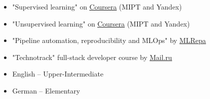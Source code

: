 \begin{itemize}
	\item "Supervised learning" on \href{https://www.coursera.org/learn/supervised-learning?specialization=machine-learning-data-analysis}{\underline{Coursera}} (MIPT and Yandex)
	\item "Unsupervised learning" on \href{https://www.coursera.org/learn/unsupervised-learning?specialization=machine-learning-data-analysis}{\underline{Coursera}} (MIPT and Yandex)
    \item "Pipeline automation, reproducibility and MLOps" by \href{https://ml-repa.ru/reproducibility-pipelines-automation-mlops}{\underline{MLRepa}}
	\item "Technotrack" full-stack developer course by \href{https://track.mail.ru/}{\underline{Mail.ru}}
\end{itemize}







\begin{itemize}
	\item English -- Upper-Intermediate
    \item German -- Elementary
\end{itemize}

